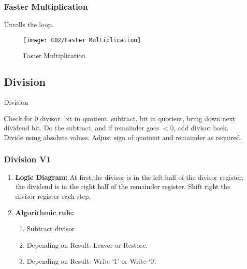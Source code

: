 \subsubsection{Faster Multiplication}
Unrolls the loop. 
\begin{figure}[H]
    \centering
    \texttt{[image: CO2/Faster Multiplication]}
    \caption{Faster Multiplication}
\end{figure}

\subsection{Division}

\begin{algorithm}[H]
    \caption{Division}
    \begin{algorithmic}
        \State Check for 0 divisor. 
                 bit in quotient, subtract. 
            \Else
                 bit in quotient, bring down next dividend bit. 
            \EndIf
        \EndFunction
            \State Do the subtract, and if remainder goes $< 0$, add divisor back. 
        \EndFunction
            \State Divide using absolute values. 
            \State Adjust sign of quotient and remainder as
            required. 
        \EndFunction
    \end{algorithmic}
\end{algorithm}

\subsubsection{Division V1}
\begin{enumerate}
    \item \textbf{Logic Diagram:}
    At first,the divisor is in the left half of the divisor register, the dividend is in the right half of the remainder register. Shift right the divisor register each step. 
    \item \textbf{Algorithmic rule:} 
    \begin{enumerate}
        \item Subtract divisor
        \item Depending on Result: Leaver or Restore. 
        \item Depending on Result: Write `1' or Write `0'. 
    \end{enumerate}
\end{enumerate}

